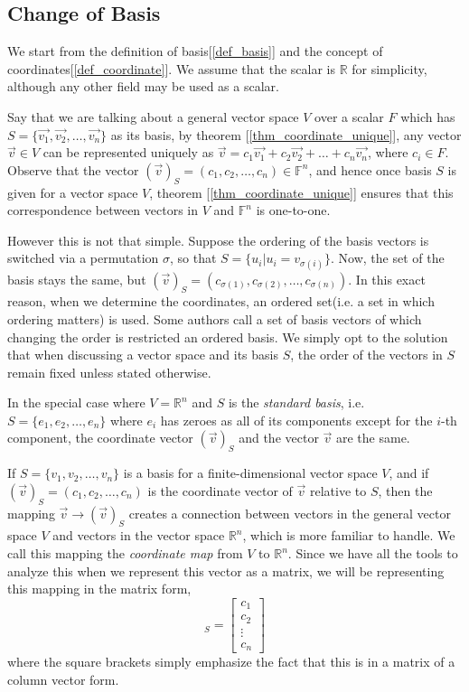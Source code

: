 \documentclass{report}
\begin{document}
	\subsection{Change of Basis}
	We start from the definition of basis[\ref{def_basis}] and the concept of coordinates[\ref{def_coordinate}]. We assume that the scalar is $\mathbb{R}$ for simplicity, although any other field may be used as a scalar.
	
	Say that we are talking about a general vector space $V$ over a scalar $F$ which has $S=\{\vec{v_1},\vec{v_2},\dots,\vec{v_n}\}$ as its basis, by theorem [\ref{thm_coordinate_unique}], any vector $\vec{v}\in V$ can be represented uniquely as $\vec{v}=c_1\vec{v_1}+c_2\vec{v_2}+\dots+c_n\vec{v_n}$, where $c_i \in F$. Observe that the vector $(\vec{v})_S=(c_1,c_2,\dots,c_n) \in \mathbb{F}^n$, and hence once basis $S$ is given for a vector space $V$, theorem [\ref{thm_coordinate_unique}] ensures that this correspondence between vectors in $V$ and $\mathbb{F}^n$ is one-to-one.
	
	However this is not that simple. Suppose the ordering of the basis vectors is switched via a permutation $\sigma$, so that $S=\{u_i|u_i=v_{\sigma(i)}\}$. Now, the set of the basis stays the same, but $(\vec{v})_S=(c_{\sigma(1)},c_{\sigma(2)},\dots,c_{\sigma(n)})$. In this exact reason, when we determine the coordinates, an ordered set(i.e. a set in which ordering matters) is used. Some authors call a set of basis vectors of which changing the order is restricted an ordered basis. We simply opt to the solution that when discussing a vector space and its basis $S$, the order of the vectors in $S$ remain fixed unless stated otherwise.
	
	In the special case where $V=\mathbb{R}^n$ and $S$ is the \emph{standard basis}, i.e. $S=\{e_1,e_2,\dots,e_n\}$ where $e_i$ has zeroes as all of its components except for the $i$-th component, the coordinate vector $(\vec{v})_S$ and the vector $\vec{v}$ are the same.
	
	If $S=\{v_1,v_2,\dots,v_n\}$ is a basis for a finite-dimensional vector space $V$, and if $(\vec{v})_S=(c_1,c_2,\dots,c_n)$ is the coordinate vector of $\vec{v}$ relative to $S$, then the mapping $\vec{v} \rightarrow (\vec{v})_S$ creates a connection between vectors in the general vector space $V$ and vectors in the vector space $\mathbb{R}^n$, which is more familiar to handle. We call this mapping the \emph{coordinate map} from $V$ to $\mathbb{R}^n$. Since we have all the tools to analyze this when we represent this vector as a matrix, we will be representing this mapping in the matrix form,
	\begin{displaymath}
	[\bf{v}]_S=\begin{bmatrix} c_1 \\ c_2 \\ \vdots \\ c_n \end{bmatrix}
	\end{displaymath}
	where the square brackets simply emphasize the fact that this is in a matrix of a column vector form.
	
\end{document}
